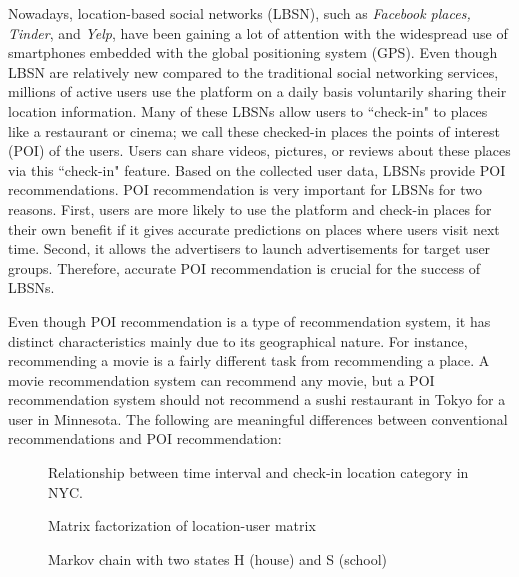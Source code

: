 \documentclass{sig-alternate}
\begin{document}
Nowadays, location-based social networks (LBSN), such as \emph{Facebook places, Tinder},  and \emph{Yelp}, 
have been gaining a lot of attention with the widespread use of smartphones embedded with the 
global positioning system (GPS). Even though LBSN are relatively new compared to 
the traditional social networking services, millions of active users use the platform on a daily basis voluntarily sharing 
their location information. Many of these LBSNs allow users to ``check-in" to
places like a restaurant or cinema; we call these checked-in places the points of interest (POI) 
of the users. Users can share videos, pictures, or reviews about these places via this ``check-in" 
feature. Based on the collected user data, LBSNs provide POI recommendations. POI recommendation 
is very important for LBSNs for two reasons. First, users are more likely to use the platform and check-in places 
for their own benefit if it gives accurate predictions on places where users visit next time. 
Second, it allows the advertisers to launch advertisements for target user groups. Therefore, 
accurate POI recommendation is crucial for the success of LBSNs. \cite{Cheng:2013}

Even though POI recommendation is a type of recommendation system, it has distinct characteristics 
mainly due to its geographical nature. For instance, recommending a movie is a fairly different task from 
recommending a place. A movie recommendation system can recommend any movie, but a POI recommendation 
system should not recommend a sushi restaurant in Tokyo for a user in Minnesota. The following are 
meaningful differences between conventional recommendations and POI recommendation:

\begin{figure}
\centering
{}
\caption{Relationship between time interval and check-in location category in NYC.}
\label{fig:NYC_checkIn}
\end{figure}

\begin{figure}
\centering
{}
\caption{Matrix factorization of location-user matrix}
\label{fig:MF}
\end{figure}

\begin{figure}
\centering
{}
\caption{Markov chain with two states H (house) and S (school)}
\label{fig:MarkovChain}
\end{figure}
\end{document}
